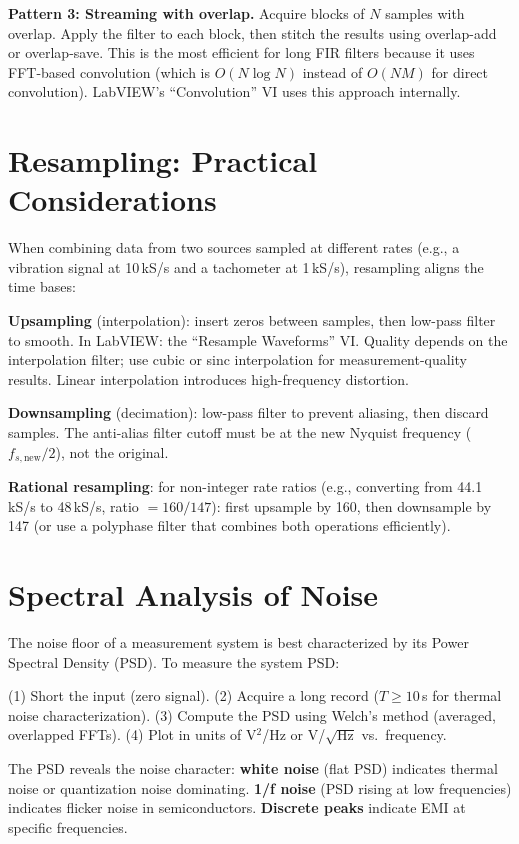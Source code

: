 \documentclass[11pt,letterpaper,twoside,openany]{book}
\begin{document}
\textbf{Pattern 3: Streaming with overlap.} Acquire blocks of $N$ samples with overlap. Apply the filter to each block, then stitch the results using overlap-add or overlap-save. This is the most efficient for long FIR filters because it uses FFT-based convolution (which is $O(N\log N)$ instead of $O(NM)$ for direct convolution). LabVIEW's ``Convolution'' VI uses this approach internally.

\section{Resampling: Practical Considerations}
When combining data from two sources sampled at different rates (e.g., a vibration signal at 10\,kS/s and a tachometer at 1\,kS/s), resampling aligns the time bases:

\textbf{Upsampling} (interpolation): insert zeros between samples, then low-pass filter to smooth. In LabVIEW: the ``Resample Waveforms'' VI. Quality depends on the interpolation filter; use cubic or sinc interpolation for measurement-quality results. Linear interpolation introduces high-frequency distortion.

\textbf{Downsampling} (decimation): low-pass filter to prevent aliasing, then discard samples. The anti-alias filter cutoff must be at the new Nyquist frequency ($f_{s,\text{new}}/2$), not the original.

\textbf{Rational resampling}: for non-integer rate ratios (e.g., converting from 44.1\,kS/s to 48\,kS/s, ratio $= 160/147$): first upsample by 160, then downsample by 147 (or use a polyphase filter that combines both operations efficiently).

\section{Spectral Analysis of Noise}
The noise floor of a measurement system is best characterized by its Power Spectral Density (PSD). To measure the system PSD:

(1) Short the input (zero signal). (2) Acquire a long record ($T \geq 10$\,s for thermal noise characterization). (3) Compute the PSD using Welch's method (averaged, overlapped FFTs). (4) Plot in units of V$^2$/Hz or V/$\sqrt{\text{Hz}}$ vs.\ frequency.

The PSD reveals the noise character: \textbf{white noise} (flat PSD) indicates thermal noise or quantization noise dominating. \textbf{1/f noise} (PSD rising at low frequencies) indicates flicker noise in semiconductors. \textbf{Discrete peaks} indicate EMI at specific frequencies.
\end{document}
